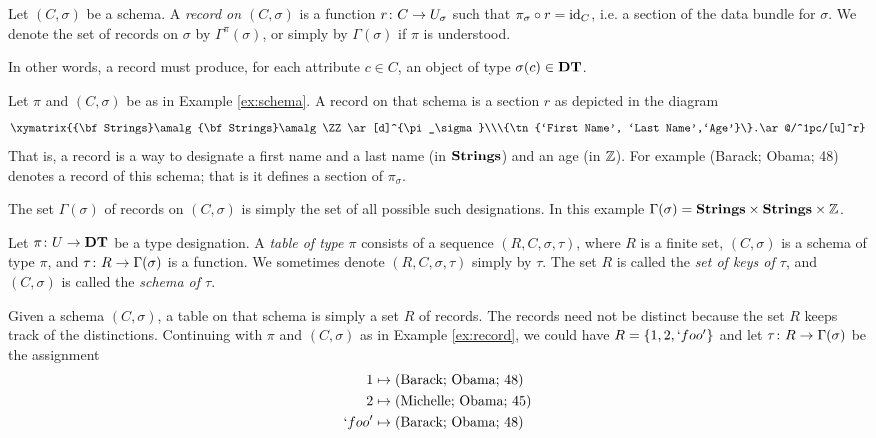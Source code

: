 \documentclass{amsart}
\def\DT{{\bf DT}}
\def\Strings{{\bf Strings}}
\begin{document}
\begin{definition}\label{def:records}

Let $(C,\sigma)$ be a schema.  A {\em record on $(C,\sigma)$} is a function $r\colon C\rightarrow U_\sigma$ such that $\pi_\sigma\circ r=\textnormal{id}_C$, i.e. a section of the data bundle for $\sigma$.  We denote the set of records on $\sigma$ by $\Gamma^\pi(\sigma)$, or simply by $\Gamma(\sigma)$ if $\pi$ is understood.

\end{definition}

In other words, a record must produce, for each attribute $c\in C$, an object of type $\sigma(c)\in\DT$.  

\begin{example}\label{ex:record}

Let $\pi$ and $(C,\sigma)$ be as in Example \ref{ex:schema}.  A record on that schema is a section $r$ as depicted in the diagram $$\xymatrix{\Strings\amalg\Strings\amalg\ZZ\ar[d]^{\pi_\sigma}\\\{\tn{`First Name', `Last Name',`Age'}\}.\ar@/^1pc/[u]^r}$$  That is, a record is a way to designate a first name and a last name (in $\Strings$) and an age (in ${\mathbb Z}$).  For example (Barack; Obama; 48) denotes a record of this schema; that is it defines a section of $\pi_\sigma$.

The set $\Gamma(\sigma)$ of records on $(C,\sigma)$ is simply the set of all possible such designations.  In this example $\Gamma(\sigma)=\Strings\cross\Strings\cross\ZZ$.

\end{example}

\begin{definition}\label{def:tables}

Let $\pi\taking U\to\DT$ be a type designation.  A {\em table of type $\pi$} consists of a sequence $(R,C,\sigma,\tau)$, where $R$ is a finite set, $(C,\sigma)$ is a schema of type $\pi$,  and $\tau\colon R\rightarrow\Gamma(\sigma)$ is a function.  We sometimes denote $(R,C,\sigma,\tau)$ simply by $\tau$.  The set $R$ is called the {\em set of keys of $\tau$}, and $(C,\sigma)$ is called the {\em schema of $\tau$}.

\end{definition}

\begin{example}\label{ex:table}

Given a schema $(C,\sigma)$, a table on that schema is simply a set $R$ of records.  The records need not be distinct because the set $R$ keeps track of the distinctions.  Continuing with $\pi$ and $(C,\sigma)$ as in Example \ref{ex:record}, we could have $R=\{1,2,`foo'\}$ and let $\tau\colon R\rightarrow\Gamma(\sigma)$ be the assignment \begin{align*} 1&\mapsto \textnormal{(Barack; Obama; 48)}\\2&\mapsto \textnormal{(Michelle; Obama; 45)}\\ `foo'&\mapsto\textnormal{(Barack; Obama; 48)}\end{align*}

\end{example}
\end{document}
